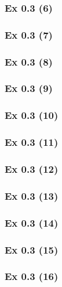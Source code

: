 \subsubsection{Ex 0.3 (6)}\label{sec:Ex_0.3.6}

\subsubsection{Ex 0.3 (7)}\label{sec:Ex_0.3.7}

\subsubsection{Ex 0.3 (8)}\label{sec:Ex_0.3.8}

\subsubsection{Ex 0.3 (9)}\label{sec:Ex_0.3.9}

\subsubsection{Ex 0.3 (10)}\label{sec:Ex_0.3.10}

\newpage		%

\subsubsection{Ex 0.3 (11)}\label{sec:Ex_0.3.11}

\subsubsection{Ex 0.3 (12)}\label{sec:Ex_0.3.12}

\subsubsection{Ex 0.3 (13)}\label{sec:Ex_0.3.13}

\subsubsection{Ex 0.3 (14)}\label{sec:Ex_0.3.14}

\subsubsection{Ex 0.3 (15)}\label{sec:Ex_0.3.15}

\subsubsection{Ex 0.3 (16)}\label{sec:Ex_0.3.16}

